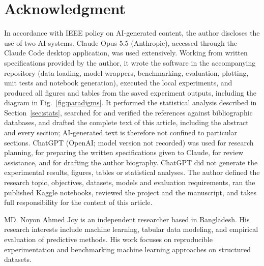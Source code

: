\documentclass{ieeeaccess}
\begin{document}
\section*{Acknowledgment}
In accordance with IEEE policy on AI-generated content, the author discloses the use of two AI systems. Claude Opus 5.5 (Anthropic), accessed through the Claude Code desktop application, was used extensively. Working from written specifications provided by the author, it wrote the software in the accompanying repository (data loading, model wrappers, benchmarking, evaluation, plotting, unit tests and notebook generation), executed the local experiments, and produced all figures and tables from the saved experiment outputs, including the diagram in Fig.~\ref{fig:paradigms}. It performed the statistical analysis described in Section~\ref{sec:stats}, searched for and verified the references against bibliographic databases, and drafted the complete text of this article, including the abstract and every section; AI-generated text is therefore not confined to particular sections. ChatGPT (OpenAI; model version not recorded) was used for research planning, for preparing the written specifications given to Claude, for review assistance, and for drafting the author biography. ChatGPT did not generate the experimental results, figures, tables or statistical analyses. The author defined the research topic, objectives, datasets, models and evaluation requirements, ran the published Kaggle notebooks, reviewed the project and the manuscript, and takes full responsibility for the content of this article.

\begingroup
\raggedright


\endgroup

\begin{IEEEbiographynophoto}{MD. Noyon Ahmed Joy}
is an independent researcher based in Bangladesh. His research interests include machine learning, tabular data modeling, and empirical evaluation of predictive methods. His work focuses on reproducible experimentation and benchmarking machine learning approaches on structured datasets.
\end{IEEEbiographynophoto}

\EOD
\end{document}
